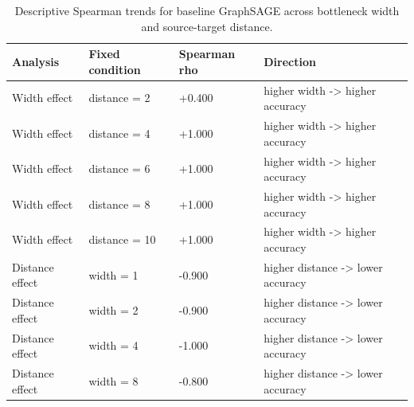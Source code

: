 \begin{table}[htbp]
\caption{Descriptive Spearman trends for baseline GraphSAGE across bottleneck width and source-target distance.}
\label{tab:longrange_structural_trends}
\begin{tabular}{llll}
\toprule
Analysis & Fixed condition & Spearman rho & Direction \\
\midrule
Width effect & distance = 2 & +0.400 & higher width -> higher accuracy \\
Width effect & distance = 4 & +1.000 & higher width -> higher accuracy \\
Width effect & distance = 6 & +1.000 & higher width -> higher accuracy \\
Width effect & distance = 8 & +1.000 & higher width -> higher accuracy \\
Width effect & distance = 10 & +1.000 & higher width -> higher accuracy \\
Distance effect & width = 1 & -0.900 & higher distance -> lower accuracy \\
Distance effect & width = 2 & -0.900 & higher distance -> lower accuracy \\
Distance effect & width = 4 & -1.000 & higher distance -> lower accuracy \\
Distance effect & width = 8 & -0.800 & higher distance -> lower accuracy \\
\bottomrule
\end{tabular}
\end{table}
